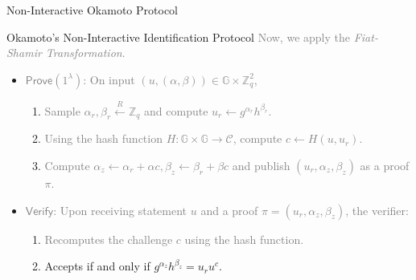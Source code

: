 \documentclass[xcolor={usenames,dvipsnames}]{beamer}
\begin{document}
    \begin{frame}{Non-Interactive Okamoto Protocol}
        \begin{block}{Okamoto's Non-Interactive Identification Protocol}
            \textcolor{gray}{Now, we apply the \textit{Fiat-Shamir Transformation}.}
            \begin{itemize}
                \item \textcolor{gray}{$\mathsf{Prove}(1^{\lambda})$: On input $(u,(\alpha,\beta)) \in \mathbb{G} \times \mathbb{Z}_q^2$, }
                \begin{enumerate}
                    \item \textcolor{gray}{Sample $\alpha_r,\beta_r \xleftarrow{R} \mathbb{Z}_q$ and compute $u_r \gets g^{\alpha_r}h^{\beta_r}$.}
                    \item \textcolor{gray}{Using the hash function $H: \mathbb{G} \times \mathbb{G} \to \mathcal{C}$, compute $c \gets H(u,u_r)$.}
                    \item \textcolor{gray}{Compute $\alpha_z \gets \alpha_r + \alpha c, \beta_z \gets \beta_r + \beta c$ and publish $(u_r,\alpha_z,\beta_z)$ as a proof $\pi$.}
                \end{enumerate}
                \item \textcolor{gray}{$\mathsf{Verify}$: Upon receiving statement $u$ and a proof $\pi=(u_r,\alpha_z,\beta_z)$, the verifier:}
                \begin{enumerate}
                    \item \textcolor{gray}{Recomputes the challenge $c$ using the hash function.}
                    \item \textcolor{blue!80!black}{Accepts if and only if $g^{\alpha_z}h^{\beta_z} = u_ru^c$.}
                \end{enumerate}
            \end{itemize}
        \end{block}
    \end{frame}
\end{document}
